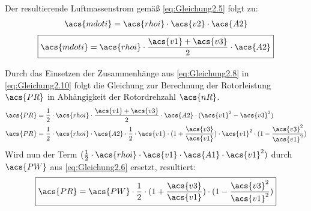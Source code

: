Der resultierende Luftmassenstrom gemäß \autoref{eq:Gleichung2.5} folgt zu:
\begin{align*}
    \acs{mdoti} = \acs{rhoi} \cdot \acs{v2} \cdot \acs{A2}
\end{align*}
\begin{equation}\label{eq:Gleichung2.10}
    \boxed{\acs{mdoti} = \acs{rhoi} \cdot \frac{\acs{v1} + \acs{v3}}{2} \cdot \acs{A2}}
\end{equation}

Durch das Einsetzen der Zusammenhänge aus \autoref{eq:Gleichung2.8} in \autoref{eq:Gleichung2.10} folgt die Gleichung zur Berechnung der Rotorleistung $\acs{PR}$ in Abhängigkeit der Rotordrehzahl $\acs{nR}$.
\begin{align*}
    \acs{PR} &= \frac{1}{2} \cdot \acs{rhoi} \cdot \frac{\acs{v1} + \acs{v3}}{2} \cdot \acs{A2} \cdot (\acs{v1}^2 - \acs{v3}^2) \\
    \acs{PR} &= \frac{1}{2} \cdot \acs{rhoi} \cdot \acs{A2} \cdot \frac{1}{2} \cdot \acs{v1} \cdot (1 + \frac{\acs{v3}}{\acs{v1}}) \cdot \acs{v1}^2 \cdot (1 - \frac{\acs{v3}^2}{\acs{v1}^2})
\end{align*}
Wird nun der Term $(\frac{1}{2} \cdot \acs{rhoi} \cdot \acs{v1} \cdot \acs{A1} \cdot \acs{v1}^2)$ durch $\acs{PW}$ aus \autoref{eq:Gleichung2.6} ersetzt, resultiert:
\begin{equation}\label{eq:Gleichung2.11}
    \boxed{\acs{PR} = \acs{PW} \cdot \frac{1}{2} \cdot (1 + \frac{\acs{v3}}{\acs{v1}}) \cdot (1 - \frac{\acs{v3}^2}{\acs{v1}^2})}
\end{equation}

